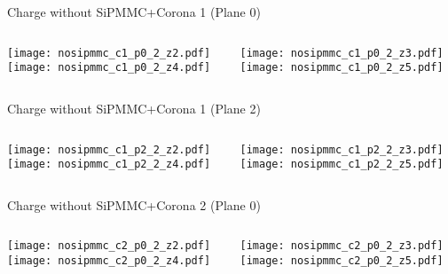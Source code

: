 \documentclass{beamer}
\begin{document}
\begin{frame}{Charge without SiPMMC+Corona 1 (Plane 0)}
	\begin{columns}[onlytextwidth]
		\begin{column}{0.5\textwidth}
			\texttt{[image: nosipmmc\_c1\_p0\_2\_z2.pdf]} \\
			\texttt{[image: nosipmmc\_c1\_p0\_2\_z4.pdf]}
		 \end{column}
		 \begin{column}{0.5\textwidth}
			\texttt{[image: nosipmmc\_c1\_p0\_2\_z3.pdf]} \\
			\texttt{[image: nosipmmc\_c1\_p0\_2\_z5.pdf]}
		 \end{column}
 \end{columns}
\end{frame}

\begin{frame}{Charge without SiPMMC+Corona 1 (Plane 2)}
	\begin{columns}[onlytextwidth]
		\begin{column}{0.5\textwidth}
			\texttt{[image: nosipmmc\_c1\_p2\_2\_z2.pdf]} \\
			\texttt{[image: nosipmmc\_c1\_p2\_2\_z4.pdf]}
		 \end{column}
		 \begin{column}{0.5\textwidth}
			\texttt{[image: nosipmmc\_c1\_p2\_2\_z3.pdf]} \\
			\texttt{[image: nosipmmc\_c1\_p2\_2\_z5.pdf]}
		 \end{column}
 \end{columns}
\end{frame}


\begin{frame}{Charge without SiPMMC+Corona 2 (Plane 0)}
	\begin{columns}[onlytextwidth]
		\begin{column}{0.5\textwidth}
			\texttt{[image: nosipmmc\_c2\_p0\_2\_z2.pdf]} \\
			\texttt{[image: nosipmmc\_c2\_p0\_2\_z4.pdf]}
		 \end{column}
		 \begin{column}{0.5\textwidth}
			\texttt{[image: nosipmmc\_c2\_p0\_2\_z3.pdf]} \\
			\texttt{[image: nosipmmc\_c2\_p0\_2\_z5.pdf]}
		 \end{column}
 \end{columns}
\end{frame}
\end{document}
